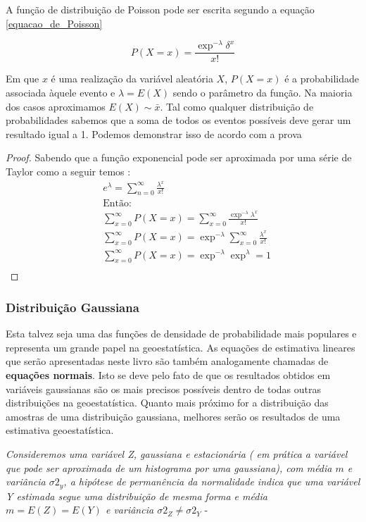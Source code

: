 A função de distribuição de Poisson pode ser escrita segundo a equação \eqref{equacao_de_Poisson}

\begin{equation}\label{equacao_de_Poisson}
P(X = x) = \frac{\exp^{-\lambda}\delta^{x}}{x!}
\end{equation}

Em que $x$ é uma realização da variável aleatória $X$, $P(X =x)$ é a probabilidade associada àquele evento e $\lambda = E(X)$ sendo o parâmetro da função. Na maioria dos casos aproximamos $E(X) \sim \bar{x}$. Tal como qualquer distribuição de probabilidades sabemos que a soma de todos os eventos possíveis deve gerar um resultado igual a 1. Podemos demonstrar isso de acordo com a prova 


\begin{proof}
	Sabendo que a função exponencial pode ser aproximada por uma série de Taylor como a seguir temos :
	\begin{align*}
	&e^{\lambda} = \sum_{n= 0}^{\infty} \frac{\lambda^{x}}{x!}\\
	&\text{Então:} \\
	&\sum_{x=0}^{\infty} P(X=x) = \sum_{x=0}^{\infty} \frac{\exp^{-\lambda}\lambda^{x}}{x!}\\ 
	&\sum_{x=0}^{\infty} P(X=x) = \exp^{-\lambda}\sum_{x=0}^{\infty} \frac{\lambda^{x}}{x!}\\
	&\sum_{x=0}^{\infty} P(X=x) = \exp^{-\lambda}\exp^{\lambda} = 1\\
	\end{align*}
\end{proof}

 
\subsubsection{Distribuição Gaussiana }

Esta talvez seja uma das funções de densidade de probabilidade mais populares e representa um grande papel na geoestatística. As equações de estimativa lineares que serão apresentadas neste livro são também analogamente chamadas de \textbf{equações normais}. Isto se deve pelo fato de que os resultados obtidos em variáveis gaussianas são os mais precisos possíveis dentro de todas outras distribuições na geoestatística. Quanto mais próximo for a distribuição das amostras de uma distribuição gaussiana, melhores serão os resultados de uma estimativa geoestatística.

\begin{proposition}
	\textit{Consideremos uma variável Z, gaussiana e estacionária ( em prática a variável que pode ser aproximada de um histograma por uma gaussiana), com média $m$ e variância $\sigma{2}_{y}$, a hipótese de permanência da normalidade indica que uma variável Y estimada segue uma distribuição de mesma forma e média $m= E(Z) = E(Y)$ e variância $\sigma{2}_{Z} \neq \sigma{2}_{Y}$} -\cite{journel1978mining}
\end{proposition}

